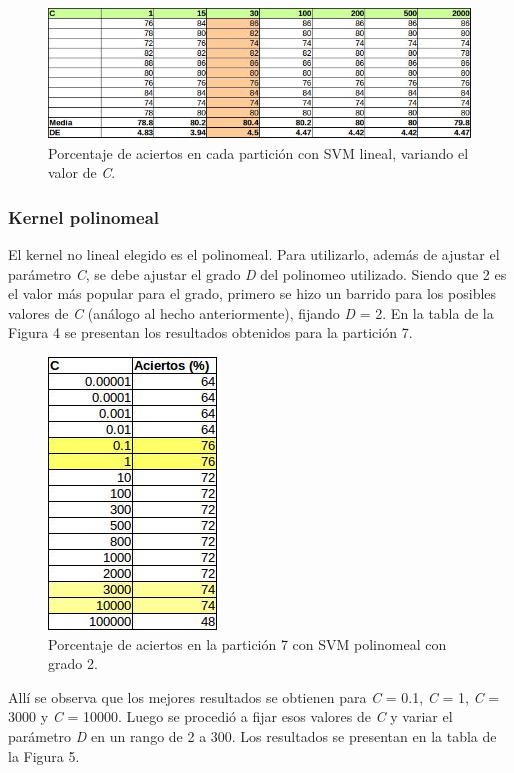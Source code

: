 \documentclass[12pt, a4paper]{article}
\begin{document}
 \begin{figure}
    \centering
	\includegraphics[scale=0.8]{tabla3}
	\caption{Porcentaje de aciertos en cada partición con SVM lineal, variando el valor de \textit{C}.}
\end{figure}



\subsubsection*{Kernel polinomeal}
El kernel no lineal elegido es el polinomeal. Para utilizarlo, además de ajustar el parámetro \textit{C}, se debe ajustar el grado \textit{D} del polinomeo utilizado. Siendo que 2 es el valor más popular para el grado, primero se hizo un barrido para los posibles valores de \textit{C} (análogo al hecho anteriormente), fijando \textit{D} = 2. En la tabla de la Figura 4 se presentan los resultados obtenidos para la partición 7.

 \begin{figure}
    \centering
	\includegraphics[scale=0.8]{tabla4}
	\caption{Porcentaje de aciertos en la partición 7 con SVM polinomeal con grado 2.}
\end{figure}

Allí se observa que los mejores resultados se obtienen para \textit{C} = 0.1, \textit{C} = 1, \textit{C} = 3000 y \textit{C} = 10000. Luego se procedió a fijar esos valores de \textit{C} y variar el parámetro \textit{D} en un rango de 2 a 300. Los resultados se presentan en la tabla de la Figura 5.
\end{document}
